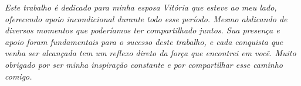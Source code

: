 \begin{dedicatoria}
   \vspace*{\fill}
   \centering
   \noindent
   \textit{ Este trabalho é dedicado para minha esposa Vitória que esteve ao meu lado, oferecendo apoio incondicional durante todo esse período. Mesmo abdicando de diversos momentos que poderíamos ter compartilhado juntos. Sua presença e apoio foram fundamentais para o sucesso deste trabalho, e cada conquista que venha ser alcançada tem um reflexo direto da força que encontrei em você. Muito obrigado por ser minha inspiração constante e por compartilhar esse caminho comigo.  } \vspace*{\fill}
\end{dedicatoria}